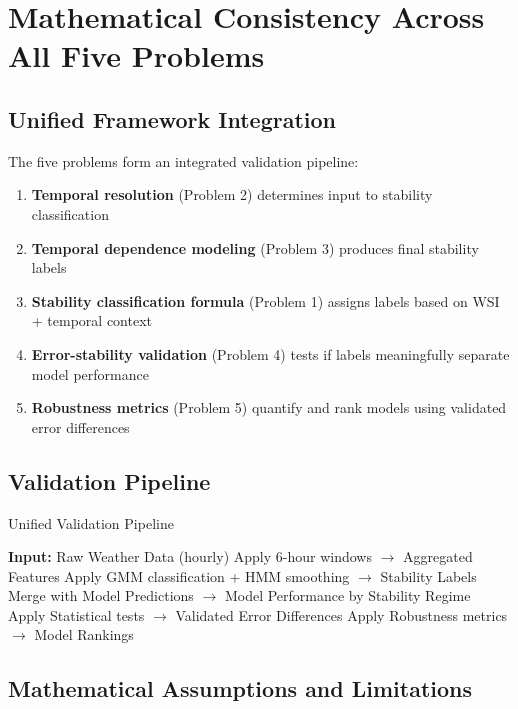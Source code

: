 \documentclass[11pt,a4paper]{article}
\begin{document}
\section{Mathematical Consistency Across All Five Problems}

\subsection{Unified Framework Integration}

The five problems form an integrated validation pipeline:

\begin{enumerate}
    \item \textbf{Temporal resolution} (Problem 2) determines input to stability classification
    \item \textbf{Temporal dependence modeling} (Problem 3) produces final stability labels
    \item \textbf{Stability classification formula} (Problem 1) assigns labels based on WSI + temporal context
    \item \textbf{Error-stability validation} (Problem 4) tests if labels meaningfully separate model performance
    \item \textbf{Robustness metrics} (Problem 5) quantify and rank models using validated error differences
\end{enumerate}

\subsection{Validation Pipeline}

\begin{algorithm}
\caption{Unified Validation Pipeline}
\begin{algorithmic}[1]
\STATE \textbf{Input:} Raw Weather Data (hourly)
\STATE Apply 6-hour windows $\rightarrow$ Aggregated Features
\STATE Apply GMM classification + HMM smoothing $\rightarrow$ Stability Labels
\STATE Merge with Model Predictions $\rightarrow$ Model Performance by Stability Regime
\STATE Apply Statistical tests $\rightarrow$ Validated Error Differences
\STATE Apply Robustness metrics $\rightarrow$ Model Rankings
\end{algorithmic}
\end{algorithm}

\subsection{Mathematical Assumptions and Limitations}
\end{document}
